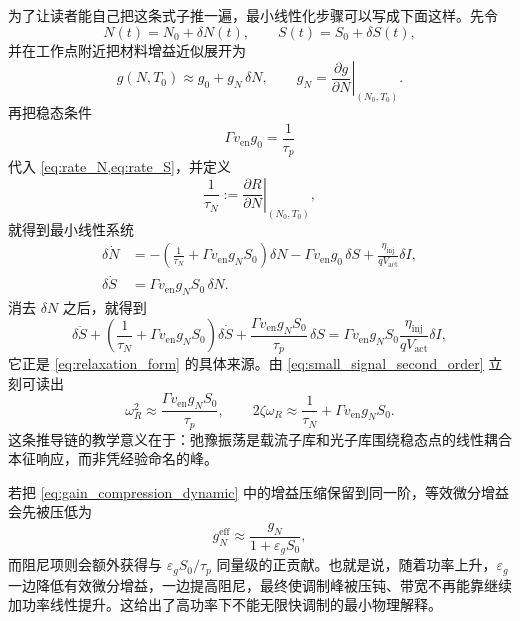 为了让读者能自己把这条式子推一遍，最小线性化步骤可以写成下面这样。先令
\[
N(t)=N_0+\delta N(t),\qquad S(t)=S_0+\delta S(t),
\]
并在工作点附近把材料增益近似展开为
\begin{equation}
g(N,T_0)\approx g_0 + g_N\,\delta N,
\qquad
g_N=\left.\frac{\partial g}{\partial N}\right|_{(N_0,T_0)}.
\label{eq:gain_linearization_dynamic}
\end{equation}
再把稳态条件
\[
\Gamma v_{\mathrm{en}} g_0=\frac{1}{\tau_p}
\]
代入 \cref{eq:rate_N,eq:rate_S}，并定义
\begin{equation}
\frac{1}{\tau_N}
:=
\left.\frac{\partial R}{\partial N}\right|_{(N_0,T_0)},
\label{eq:tauN_def}
\end{equation}
就得到最小线性系统
\begin{align}
\delta \dot N
&=
-\left(\frac{1}{\tau_N}+\Gamma v_{\mathrm{en}} g_N S_0\right)\delta N
-\Gamma v_{\mathrm{en}} g_0\,\delta S
+
\frac{\eta_{\mathrm{inj}}}{qV_{\mathrm{act}}}\delta I,
\label{eq:lin_rate_N}
\\
\delta \dot S
&=
\Gamma v_{\mathrm{en}} g_N S_0\,\delta N.
\label{eq:lin_rate_S}
\end{align}
消去 $\delta N$ 之后，就得到
\begin{equation}
\delta \ddot S
+
\left(\frac{1}{\tau_N}+\Gamma v_{\mathrm{en}} g_N S_0\right)\delta \dot S
+
\frac{\Gamma v_{\mathrm{en}} g_N S_0}{\tau_p}\,\delta S
=
\Gamma v_{\mathrm{en}} g_N S_0\frac{\eta_{\mathrm{inj}}}{qV_{\mathrm{act}}}\delta I,
\label{eq:small_signal_second_order}
\end{equation}
它正是 \cref{eq:relaxation_form} 的具体来源。由 \cref{eq:small_signal_second_order} 立刻可读出
\begin{equation}
\omega_R^2 \approx \frac{\Gamma v_{\mathrm{en}} g_N S_0}{\tau_p},
\qquad
2\zeta\omega_R \approx \frac{1}{\tau_N}+\Gamma v_{\mathrm{en}} g_N S_0.
\label{eq:omegaR_zeta}
\end{equation}
这条推导链的教学意义在于：弛豫振荡是载流子库和光子库围绕稳态点的线性耦合本征响应，而非凭经验命名的峰。

若把 \cref{eq:gain_compression_dynamic} 中的增益压缩保留到同一阶，等效微分增益会先被压低为
\begin{equation}
g_N^{\mathrm{eff}}
\approx
\frac{g_N}{1+\varepsilon_g S_0},
\label{eq:gN_effective_compression}
\end{equation}
而阻尼项则会额外获得与 $\varepsilon_g S_0/\tau_p$ 同量级的正贡献。也就是说，随着功率上升，$\varepsilon_g$ 一边降低有效微分增益，一边提高阻尼，最终使调制峰被压钝、带宽不再能靠继续加功率线性提升。这给出了高功率下不能无限快调制的最小物理解释。


